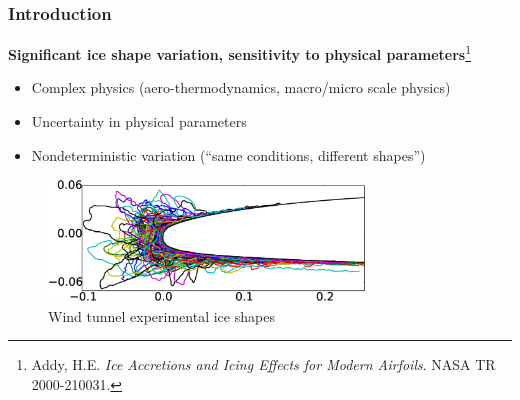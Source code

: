 \documentclass[9pt]{beamer}
\begin{document}
\begin{frame}
\frametitle{Introduction}
\label{sec-1-2}

\textbf{Significant ice shape variation, sensitivity to physical parameters}\footnote{Addy, H.E. \emph{Ice Accretions and Icing Effects for Modern Airfoils}. NASA TR 2000-210031.
 }
\begin{itemize}
\item Complex physics (aero-thermodynamics, macro/micro scale physics)
\item Uncertainty in physical parameters
\item Nondeterministic variation (``same conditions, different shapes'')
\end{itemize}

\vspace*{-0.0cm}\begin{figure}
      \includegraphics[width=0.75\textwidth]{GlobalDataSet}
      \caption{Wind tunnel experimental ice shapes}
\end{figure}
\end{frame}
\end{document}
